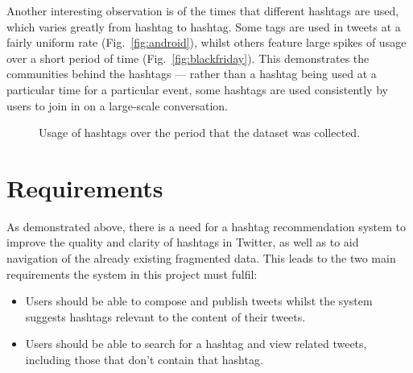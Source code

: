 \documentclass[11pt,a4paper]{report}
\begin{document}
Another interesting observation is of the times that different hashtags are used, which varies greatly from hashtag to hashtag. Some tags are used in tweets at a fairly uniform rate (Fig.~\ref{fig:android}), whilst others feature large spikes of usage over a short period of time (Fig.~\ref{fig:blackfriday}). This demonstrates the communities behind the hashtags --- rather than a hashtag being used at a particular time for a particular event, some hashtags are used consistently by users to join in on a large-scale conversation.

\begin{figure}[htpb]
    \centering
    \caption{Usage of hashtags over the period that the dataset was collected.}
\end{figure}

\section{Requirements}

As demonstrated above, there is a need for a hashtag recommendation system to improve the quality and clarity of hashtags in Twitter, as well as to aid navigation of the already existing fragmented data. This leads to the two main requirements the system in this project must fulfil:
\begin{itemize}
    \item Users should be able to compose and publish tweets whilst the system suggests hashtags relevant to the content of their tweets.
    \item Users should be able to search for a hashtag and view related tweets, including those that don't contain that hashtag.
\end{itemize}
\end{document}
